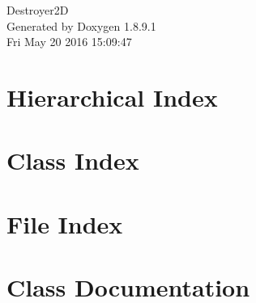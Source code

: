 \documentclass[twoside]{book}
\newcommand{\+}{\discretionary{\mbox{\scriptsize$\hookleftarrow$}}{}{}}
\newcommand{\clearemptydoublepage}{%
  \newpage{\pagestyle{empty}\cleardoublepage}%
}
\begin{document}
\hypersetup{pageanchor=false,
             bookmarks=true,
             bookmarksnumbered=true,
             pdfencoding=unicode
            }
\begin{titlepage}
\vspace*{7cm}
\begin{center}%
{\Large Destroyer2\+D }\\
\vspace*{1cm}
{\large Generated by Doxygen 1.8.9.1}\\
\vspace*{0.5cm}
{\small Fri May 20 2016 15:09:47}\\
\end{center}
\end{titlepage}
\clearemptydoublepage
\tableofcontents
\clearemptydoublepage
{}
\hypersetup{pageanchor=true}

\chapter{Hierarchical Index}

\chapter{Class Index}

\chapter{File Index}

\chapter{Class Documentation}






































\end{document}
